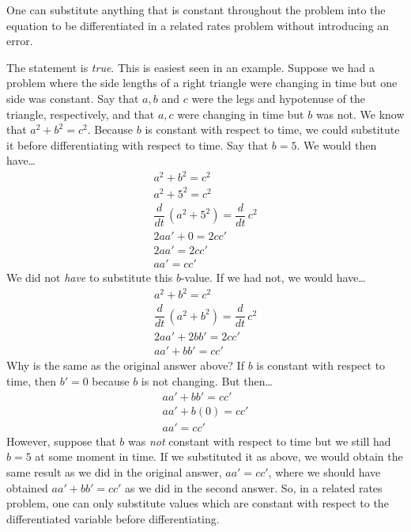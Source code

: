 \documentclass[11pt,letterpaper]{article}
\begin{document}
 One can substitute anything that is constant throughout the problem into the equation to be differentiated in a related rates problem without introducing an error. \pspace

\sol The statement is \textit{true}. This is easiest seen in an example. Suppose we had a problem where the side lengths of a right triangle were changing in time but one side was constant. Say that $a, b$ and $c$ were the legs and hypotenuse of the triangle, respectively, and that $a, c$ were changing in time but $b$ was not. We know that $a^2 + b^2= c^2$. Because $b$ is constant with respect to time, we could substitute it before differentiating with respect to time. Say that $b= 5$. We would then have\dots
	\[
	\begin{gathered}
	a^2 + b^2= c^2 \\
	a^2 + 5^2= c^2 \\
	\dfrac{d}{dt} \,(a^2 + 5^2)= \dfrac{d}{dt} \,c^2 \\
	2aa' + 0= 2cc' \\
	2aa'= 2cc' \\
	aa'= cc'
	\end{gathered}
	\]
We did not \textit{have} to substitute this $b$-value. If we had not, we would have\dots
	\[
	\begin{gathered}
	a^2 + b^2= c^2 \\
	\dfrac{d}{dt} \,(a^2 + b^2)= \dfrac{d}{dt} \,c^2 \\
	2aa' + 2bb'= 2cc' \\
	aa' + bb'= cc'
	\end{gathered}
	\]
Why is the same as the original answer above? If $b$ is constant with respect to time, then $b'= 0$ because $b$ is not changing. But then\dots
	\[
	\begin{gathered}
	aa' + bb'= cc' \\
	aa' + b(0)= cc' \\
	aa'= cc' 
	\end{gathered}
	\]
However, suppose that $b$ was \textit{not} constant with respect to time but we still had $b= 5$ at some moment in time. If we substituted it as above, we would obtain the same result as we did in the original answer, $aa'= cc'$, where we should have obtained $aa' + bb'= cc'$ as we did in the second answer. So, in a related rates problem, one can only substitute values which are constant with respect to the differentiated variable before differentiating. \pvspace{1.3cm}
\end{document}

